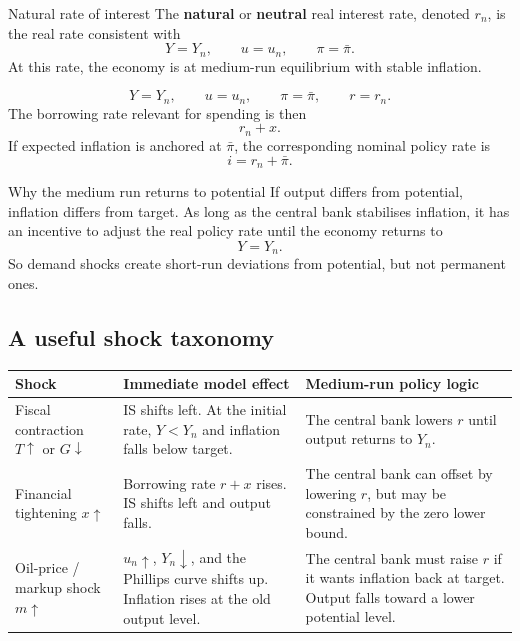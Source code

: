 \documentclass[12pt]{article}
\begin{document}
\begin{definition}{Natural rate of interest}{}
The \textbf{natural} or \textbf{neutral} real interest rate, denoted $r_n$, is the real rate consistent with
\[
Y=Y_n,\qquad u=u_n,\qquad \pi=\bar{\pi}.
\]
At this rate, the economy is at medium-run equilibrium with stable inflation.
\end{definition}

\begin{keyformula}[title={Key Formula: Medium-run equilibrium}]
\[
Y=Y_n,\qquad u=u_n,\qquad \pi=\bar{\pi},\qquad r=r_n.
\]
The borrowing rate relevant for spending is then
\[
r_n+x.
\]
If expected inflation is anchored at \(\bar{\pi}\), the corresponding nominal policy rate is
\[
i=r_n+\bar{\pi}.
\]
\end{keyformula}

\begin{theorem}{Why the medium run returns to potential}{}
If output differs from potential, inflation differs from target. As long as the central bank stabilises inflation, it has an incentive to adjust the real policy rate until the economy returns to
\[
Y=Y_n.
\]
So demand shocks create short-run deviations from potential, but not permanent ones.
\end{theorem}

\subsection{A useful shock taxonomy}

\begin{center}
\renewcommand{\arraystretch}{1.2}
\begin{tabularx}{\textwidth}{|p{3.1cm}|X|X|}
\hline
\textbf{Shock} & \textbf{Immediate model effect} & \textbf{Medium-run policy logic} \\
\hline
Fiscal contraction \(T\uparrow\) or \(G\downarrow\) & IS shifts left. At the initial rate, \(Y<Y_n\) and inflation falls below target. & The central bank lowers \(r\) until output returns to \(Y_n\). \\
\hline
Financial tightening \(x\uparrow\) & Borrowing rate \(r+x\) rises. IS shifts left and output falls. & The central bank can offset by lowering \(r\), but may be constrained by the zero lower bound. \\
\hline
Oil-price / markup shock \(m\uparrow\) & \(u_n\uparrow\), \(Y_n\downarrow\), and the Phillips curve shifts up. Inflation rises at the old output level. & The central bank must raise \(r\) if it wants inflation back at target. Output falls toward a lower potential level. \\
\hline
\end{tabularx}
\end{center}
\end{document}
